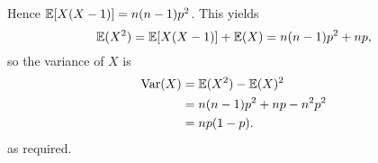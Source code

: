 Hence $\mathbb{E}[X(X - 1)]=n(n-1)p^2$. This yields
\[
\mathbb{E}(X^2) 
	= \mathbb{E}[X(X-1)] + \mathbb{E}(X)
	= n(n-1)p^2 + np,
\]
so the variance of $X$ is 
\begin{align*}
\text{Var}(X)	
	& = \mathbb{E}(X^2)-\mathbb{E}(X)^2 \\
	& = n(n-1)p^2 + np - n^2p^2 \\
	& = np(1-p).
\end{align*}
as required.

\endinput
